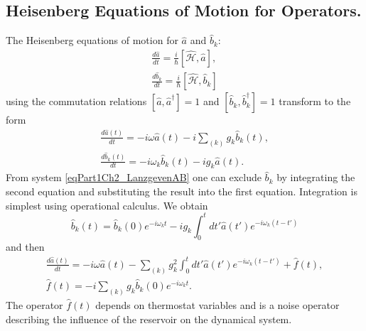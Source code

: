 \subsection{Heisenberg Equations of Motion for Operators.}
The Heisenberg equations of motion for $\hat{a}$ and $\hat{b}_{k}$:
\begin{eqnarray}
\frac{d \hat{a}}{d t} = \frac{i}{\hbar}\left[
 \hat{\mathcal{H}}, \hat{a}
\right],
\nonumber \\
\frac{d \hat{b}_k}{d t} = \frac{i}{\hbar}\left[
 \hat{\mathcal{H}}, \hat{b}_k
\right]
\nonumber
\end{eqnarray}
using the commutation relations 
$\left[\hat{a}, \hat{a}^{\dag}\right] = 1$ and 
$\left[\hat{b}_k, \hat{b}_{k}^{\dag}\right] = 1$ transform to the form
\begin{eqnarray}
\frac{d \hat{a}\left(t\right)}{d t} = -i \omega \hat{a}\left(t\right) - i\sum_{(k)}g_k
\hat{b}_k\left(t\right),
\nonumber \\
\frac{d \hat{b}_k\left(t\right)}{d t} = -i \omega_k
\hat{b}_{k}\left(t\right) - i g_k \hat{a}\left(t\right).
\label{eqPart1Ch2_LanzgevenAB}
\end{eqnarray}
From system \eqref{eqPart1Ch2_LanzgevenAB} one can exclude $\hat{b}_k$ by integrating the second equation and substituting the result into the first equation. Integration is simplest using operational calculus. We obtain
\begin{equation}
\hat{b}_k\left(t\right) = 
\hat{b}_k\left(0\right) e^{-i \omega_k t} 
- i g_k \int_0^t d t' \hat{a}\left(t'\right)e^{-i \omega_k\left(t - t'\right)}
\nonumber
\end{equation}
and then
\begin{eqnarray}
\frac{d \hat{a}\left(t\right)}{dt} = 
- i \omega \hat{a}\left(t\right) - \sum_{(k)} g_k^2 \int_0^t
d t'  \hat{a}\left(t'\right)e^{-i \omega_k\left(t - t'\right)}
+ \hat{f}\left(t\right),
\nonumber \\
\hat{f}\left(t\right) = -i \sum_{(k)} g_k \hat{b}_k\left(0\right)
e^{-i \omega_k t}.
\label{eqPart1Ch2_LanzgevenA}
\end{eqnarray}
The operator $\hat{f}\left(t\right)$ depends on thermostat variables and is a noise operator describing the influence of the reservoir on the dynamical system.

